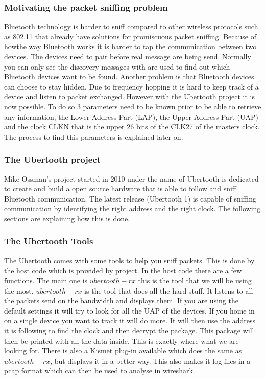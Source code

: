 \subsubsection{Motivating the packet sniffing problem}
Bluetooth technology is harder to sniff compared to other wireless protocols such as 802.11 that already have solutions for promiscuous packet sniffing. Because of howthe way Bluetooth works it is harder to tap the communication between two devices. The devices need to pair before real message are being send. Normally you can only see the discovery messages with are used to find out which Bluetooth devices want to be found. Another problem is that Bluetooth devices can choose to stay hidden.
Due to frequency hopping it is hard to keep track of a device and listen to packet exchanged. However with the Ubertooth project it is now possible. To do so 3 parameters need to be known prior to be able to retrieve any information, the Lower Address Part (LAP), the Upper Address Part (UAP) and the clock CLKN that is the upper 26 bits of the CLK27 of the masters clock. The process to find this parameters is explained later on.

\subsubsection{The Ubertooth project}
\label{subsubsec:ubertooth}
Mike Ossman's project  started in 2010 under the name of Ubertooth is dedicated to create and build a open source hardware that is able to follow and sniff Bluetooth communication. The latest release (Ubertooth 1) is capable of sniffing communication by identifying the right address and the right clock. The following sections are explaining how this is done.

\subsubsection{The Ubertooth Tools}
\label{subsubsec:ubertooth_tools}
The Ubertooth comes with some tools to help you sniff packets. This is done by the host code which is provided by project. In the host code there are a few functions. The main one is $ubertooth-rx$ this is the tool that we will be using the most. $ubertooth-rx$ is the tool that does all the hard stuff. It listens to all the packets send on the bandwidth and displays them. If you are using the default settings it will try to look for all the UAP of the devices. If you home in on a single device you want to track it will do more. It will then use the address it is following to find the clock and then decrypt the package. This package will then be printed with all the data inside. This is exactly where what we are looking for. There is also a Kismet plug-in available which does the same as $ubertooth-rx$, but displays it in a better way. This also makes it log files in a pcap format which can then be used to analyse in wireshark. 

